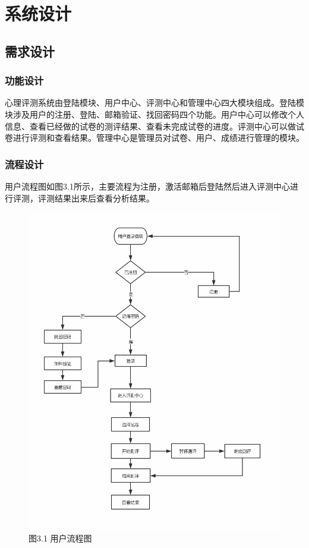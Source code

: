 \section{系统设计}

\subsection{需求设计}

\subsubsection{功能设计}

心理评测系统由登陆模块、用户中心、评测中心和管理中心四大模块组成。登陆模块涉及用户的注册、登陆、邮箱验证、找回密码四个功能。用户中心可以修改个人信息、查看已经做的试卷的测评结果、查看未完成试卷的进度。评测中心可以做试卷进行评测和查看结果。管理中心是管理员对试卷、用户、成绩进行管理的模块。

\subsubsection{流程设计}

用户流程图如图3.1所示，主要流程为注册，激活邮箱后登陆然后进入评测中心进行评测，评测结果出来后查看分析结果。

\begin{figure}[thbp!]
	\centering
	\includegraphics[width=0.7\linewidth]{figure/user_use}
	\label{fig:user_use} \\
		图3.1 用户流程图
\end{figure}

